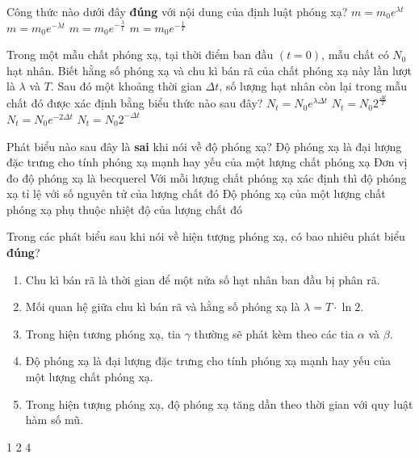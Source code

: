 \begin{ex}
	Công thức nào dưới đây \textbf{đúng} với nội dung của định luật phóng xạ?
	\choice
	{$m=m_0e^{\lambda t}$}
	{\True $m=m_0e^{-\lambda t}$}
	{$m=m_0 e^{-\frac{\lambda}{t}}$}
	{$m=m_0 e^{-\frac{1}{T}}$}
	\loigiai{}
\end{ex}
\begin{ex}
	Trong một mẫu chất phóng xạ, tại thời điểm ban đầu $(t=0)$, mẫu chất có $N_0$ hạt nhân. Biết hằng số phóng xạ và chu kì bán rã của chất phóng xạ này lần lượt là $\lambda$ và $T$. Sau đó một khoảng thời gian $\Delta t$, số lượng hạt nhân còn lại trong mẫu chất đó được xác định bằng biểu thức nào sau đây?
	\choice
	{$N_{t}=N_0 e^{\lambda \Delta t}$}
	{$N_{t}=N_0 2^{\frac{\Delta t}{T}}$}
	{\True $N_{t}=N_0 e^{-2 \Delta t}$}
	{$N_{t}=N_0 2^{-\Delta t}$}
	\loigiai{}
\end{ex}
\begin{ex}
	Phát biểu nào sau đây là \textbf{sai} khi nói về độ phóng xạ?
	\choice
	{Độ phóng xạ là đại lượng đặc trưng cho tính phóng xạ mạnh hay yếu của một lượng chất phóng xạ}
	{Đơn vị đo độ phóng xạ là becquerel}
	{Với mỗi lượng chất phóng xạ xác định thì độ phóng xạ tỉ lệ với số nguyên tử của lượng chất đó}
	{\True Độ phóng xạ của một lượng chất phóng xạ phụ thuộc nhiệt độ của lượng chất đó}
	\loigiai{}
\end{ex}
\begin{ex}
	Trong các phát biểu sau khi nói về hiện tượng phóng xạ, có bao nhiêu phát biểu \textbf{đúng}?
	\begin{enumerate}[label=(\arabic*)]
		\item Chu kì bán rã là thời gian để một nửa số hạt nhân ban đầu bị phân rã.
		\item Mối quan hệ giữa chu kì bán rã và hằng số phóng xạ là $\lambda=T \cdot \ln 2$.
		\item Trong hiện tương phóng xạ, tia $\gamma$ thường sẽ phát kèm theo các tia $\alpha$ và $\beta$.
		\item Độ phóng xạ là đại lượng đặc trưng cho tính phóng xạ mạnh hay yếu của một lượng chất phóng xạ.
		\item Trong hiện tượng phóng xạ, độ phóng xạ tăng dần theo thời gian với quy luật hàm số mũ.
	\end{enumerate}
	\choice
	{1}
	{2}
	{}
	{4}
\end{ex}
